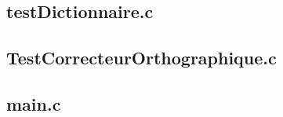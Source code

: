 	\subsection{testDictionnaire.c}
	
	
	\subsection{TestCorrecteurOrthographique.c}
	

	\subsection{main.c}
	

